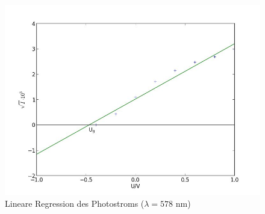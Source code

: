	\begin{figure}[h]
		\begin{center}
		\includegraphics[scale=0.7]{picagelblin.jpg}
		\caption{Lineare Regression des Photostroms ($\lambda=578$ nm)}
		\label{picagelblin}
		\end{center}	
	\end{figure}